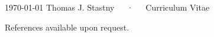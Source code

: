 \documentclass[11pt, a4paper]{awesome-cv}
\begin{document}
\makecvheader

\makecvfooter
  {\today}
  {Thomas J. Stastny~~~·~~~Curriculum Vitae}
  {\thepage}


\begin{minipage}[t]{0.32\textwidth}
\noindent{}

\vspace{\acvSectionTopSkip}

\vspace{\acvSectionTopSkip}

\vspace{\acvSectionTopSkip}
\end{minipage}%
\hfill
\noindent
\begin{minipage}[t]{0.65\textwidth}

\vspace{\acvSectionTopSkip}
\noindent{}
\end{minipage}%

\vspace{-1mm}

\vspace{1.5mm}
\raggedleft
References available upon request.


\end{document}
